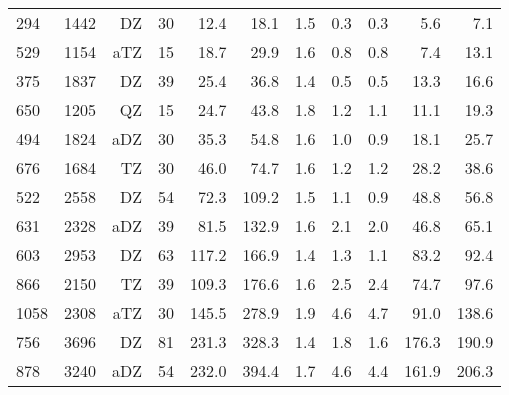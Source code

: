 \begin{table}[H]
\begin{tabular}{lrrrrrrrrrr}
 294& 1442&    DZ&    30&                12.4 &               18.1&     1.5 &                0.3 &                0.3&                 5.6&                 7.1\\
 529& 1154&   aTZ&    15&                18.7 &               29.9&     1.6 &                0.8 &                0.8&                 7.4&                13.1\\
 375& 1837&    DZ&    39&                25.4 &               36.8&     1.4 &                0.5 &                0.5&                13.3&                16.6\\
 650& 1205&    QZ&    15&                24.7 &               43.8&     1.8 &                1.2 &                1.1&                11.1&                19.3\\
 494& 1824&   aDZ&    30&                35.3 &               54.8&     1.6 &                1.0 &                0.9&                18.1&                25.7\\
 676& 1684&    TZ&    30&                46.0 &               74.7&     1.6 &                1.2 &                1.2&                28.2&                38.6\\
 522& 2558&    DZ&    54&                72.3 &              109.2&     1.5 &                1.1 &                0.9&                48.8&                56.8\\
 631& 2328&   aDZ&    39&                81.5 &              132.9&     1.6 &                2.1 &                2.0&                46.8&                65.1\\
 603& 2953&    DZ&    63&               117.2 &              166.9&     1.4 &                1.3 &                1.1&                83.2&                92.4\\
 866& 2150&    TZ&    39&               109.3 &              176.6&     1.6 &                2.5 &                2.4&                74.7&                97.6\\
1058& 2308&   aTZ&    30&               145.5 &              278.9&     1.9 &                4.6 &                4.7&                91.0&               138.6\\
 756& 3696&    DZ&    81&               231.3 &              328.3&     1.4 &                1.8 &                1.6&               176.3&               190.9\\
 878& 3240&   aDZ&    54&               232.0 &              394.4&     1.7 &                4.6 &                4.4&               161.9&               206.3\\

\end{tabular}
\end{table}
